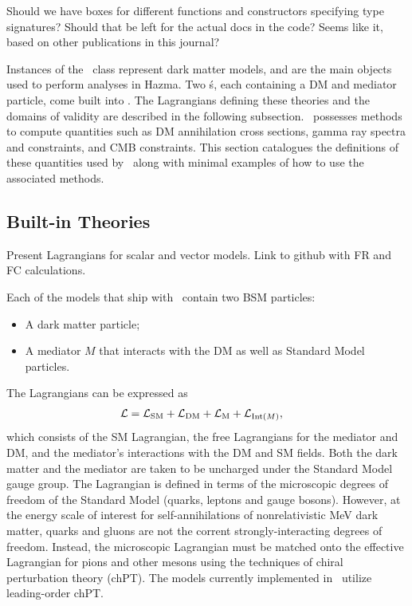 {\color{red} Should we have boxes for different functions and constructors specifying type signatures? Should that be left for the actual docs in the code? Seems like it, based on other publications in this journal?}

Instances of the \theory\ class represent dark matter models, and are the main objects used to perform analyses in Hazma. Two \theory\'s, each containing a DM and mediator particle, come built into \hazma. The Lagrangians defining these theories and the domains of validity are described in the following subsection. \theory\ possesses methods to compute quantities such as DM annihilation cross sections, gamma ray spectra and constraints, and CMB constraints. This section catalogues the definitions of these quantities used by \hazma\ along with minimal examples of how to use the associated methods.

\subsection{Built-in Theories}%
\label{sub:built_in_theories}

{\color{red} Present Lagrangians for scalar and vector models. Link to github with FR and FC calculations.}

Each of the models that ship with \hazma\ contain two BSM particles:
\begin{itemize}
    \item A dark matter particle;
    \item A mediator $M$ that interacts with the DM as well as Standard Model particles.
\end{itemize}
The Lagrangians can be expressed as
\begin{align}
    \mathcal{L} & = \mathcal{L}_{\mathrm{SM}} + \mathcal{L}_{\mathrm{DM}} + \mathcal{L}_{\mathrm{M}} + \mathcal{L}_{{\mathrm{Int}}(M)},
\end{align}
which consists of the SM Lagrangian, the free Lagrangians for the mediator and DM, and the mediator's interactions with the DM and SM fields. Both the dark matter and the mediator are taken to be uncharged under the Standard Model gauge group. The Lagrangian is defined in terms of the microscopic degrees of freedom of the Standard Model (quarks, leptons and gauge bosons). However, at the energy scale of interest for self-annihilations of nonrelativistic MeV dark matter, quarks and gluons are not the corrent strongly-interacting degrees of freedom. Instead, the microscopic Lagrangian must be matched onto the effective Lagrangian for pions and other mesons using the techniques of chiral perturbation theory (chPT). The models currently implemented in \hazma\ utilize leading-order chPT.

